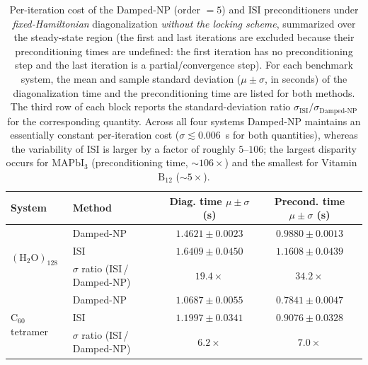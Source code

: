 \begin{table}[htbp]
\centering
\caption{%
Per-iteration cost of the Damped-NP (order $=5$) and ISI preconditioners
under \emph{fixed-Hamiltonian} diagonalization \emph{without the locking
scheme}, summarized over the steady-state region (the first and last
iterations are excluded because their preconditioning times are undefined:
the first iteration has no preconditioning step and the last iteration is a
partial/convergence step). For each benchmark system, the mean and sample
standard deviation ($\mu \pm \sigma$, in seconds) of the diagonalization time
and the preconditioning time are listed for both methods. The third row of
each block reports the standard-deviation ratio
$\sigma_{\mathrm{ISI}}/\sigma_{\text{Damped-NP}}$ for the corresponding
quantity. Across all four systems Damped-NP maintains an essentially constant
per-iteration cost ($\sigma \lesssim 0.006$~s for both quantities), whereas
the variability of ISI is larger by a factor of roughly $5$--$106$; the
largest disparity occurs for $\mathrm{MAPbI}_{3}$ (preconditioning time,
$\sim\!106\times$) and the smallest for Vitamin~$\mathrm{B}_{12}$
($\sim\!5\times$).%
}
\label{tab:s2_per_iter_std}
\begin{threeparttable}
\begin{tabular}{l l c c}
\toprule
System & Method & \makecell{Diag. time\\ $\mu \pm \sigma$ (s)}
                & \makecell{Precond. time\\ $\mu \pm \sigma$ (s)} \\
\midrule
\multirow{3}{*}{$(\mathrm{H_2O})_{128}$}
 & Damped-NP                              & $1.4621 \pm 0.0023$ & $0.9880 \pm 0.0013$ \\
 & ISI                                    & $1.6409 \pm 0.0450$ & $1.1608 \pm 0.0439$ \\
 & $\sigma$ ratio (ISI\,/\,Damped-NP)     & $19.4\times$        & $34.2\times$        \\
\midrule
\multirow{3}{*}{$\mathrm{C}_{60}$ tetramer}
 & Damped-NP                              & $1.0687 \pm 0.0055$ & $0.7841 \pm 0.0047$ \\
 & ISI                                    & $1.1997 \pm 0.0341$ & $0.9076 \pm 0.0328$ \\
 & $\sigma$ ratio (ISI\,/\,Damped-NP)     & $6.2\times$         & $7.0\times$         \\

\end{tabular}
\end{threeparttable}
\end{table}
